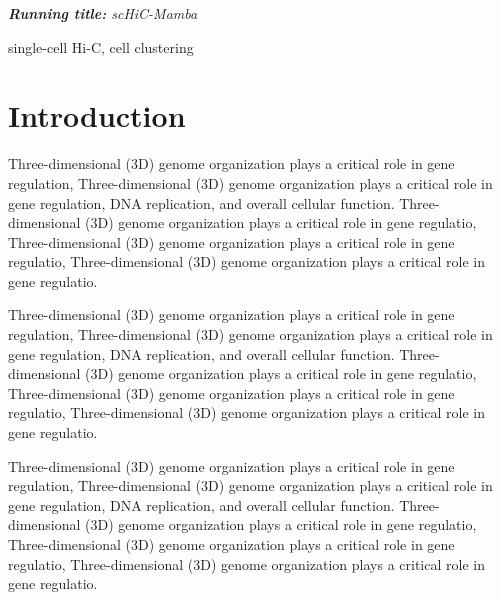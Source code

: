 \documentclass{GR}
\begin{document}
\begin{flushleft}
    {\sffamily\slshape\large\textbf{Running title:}  scHiC-Mamba} \\
\vspace*{0mm}
\end{flushleft}

\clearpage



{ 

\begin{keywords}
	single-cell Hi-C, cell clustering
\end{keywords}

\clearpage



\section*{Introduction}

Three-dimensional (3D) genome organization plays a critical role in gene regulation, Three-dimensional (3D) genome organization plays a critical role in gene regulation, DNA replication, and overall cellular function. Three-dimensional (3D) genome organization plays a critical role in gene regulatio, Three-dimensional (3D) genome organization plays a critical role in gene regulatio, Three-dimensional (3D) genome organization plays a critical role in gene regulatio.

Three-dimensional (3D) genome organization plays a critical role in gene regulation, Three-dimensional (3D) genome organization plays a critical role in gene regulation, DNA replication, and overall cellular function. Three-dimensional (3D) genome organization plays a critical role in gene regulatio, Three-dimensional (3D) genome organization plays a critical role in gene regulatio, Three-dimensional (3D) genome organization plays a critical role in gene regulatio.

Three-dimensional (3D) genome organization plays a critical role in gene regulation, Three-dimensional (3D) genome organization plays a critical role in gene regulation, DNA replication, and overall cellular function. Three-dimensional (3D) genome organization plays a critical role in gene regulatio, Three-dimensional (3D) genome organization plays a critical role in gene regulatio, Three-dimensional (3D) genome organization plays a critical role in gene regulatio.

}
\end{document}
